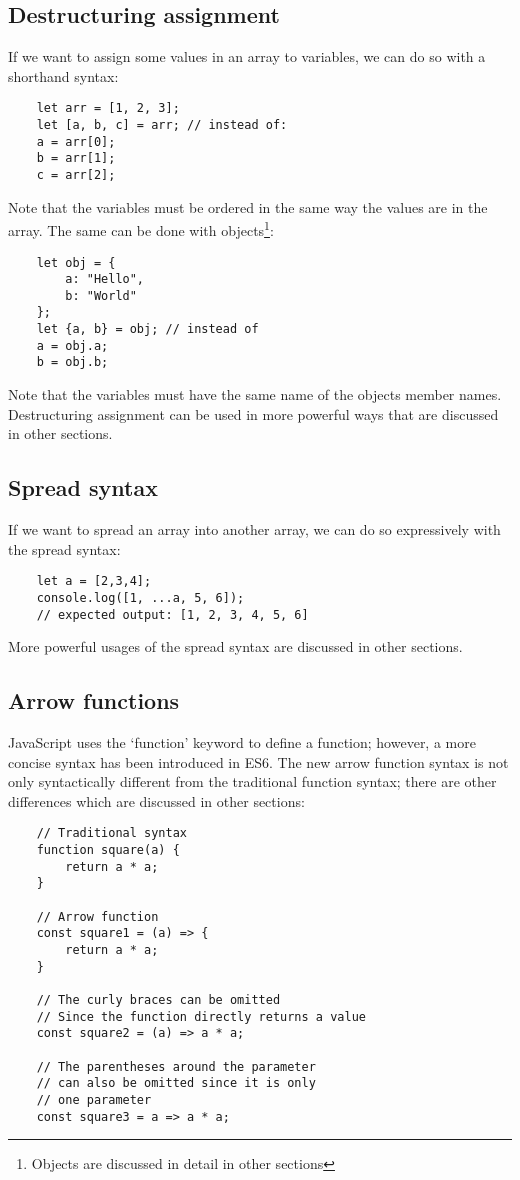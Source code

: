 \documentclass[11pt,a4paper]{article}
\begin{document}
\subsection{Destructuring assignment}
If we want to assign some values in an array to variables, we can do so with a shorthand syntax:
\begin{verbatim}
    let arr = [1, 2, 3];
    let [a, b, c] = arr; // instead of:
    a = arr[0];
    b = arr[1];
    c = arr[2];
\end{verbatim}
Note that the variables must be ordered in the same way the values are in the array.
The same can be done with objects\footnote{Objects are discussed in detail in other sections}:
\begin{verbatim}
    let obj = {
        a: "Hello",
        b: "World"
    };
    let {a, b} = obj; // instead of
    a = obj.a;
    b = obj.b;
\end{verbatim}
Note that the variables must have the same name of the objects member names. Destructuring assignment can be used in more
powerful ways that are discussed in other sections.

\subsection{\label{spread_syntax}Spread syntax}
If we want to spread an array into another array, we can do so expressively with the spread syntax:
\begin{verbatim}
    let a = [2,3,4];
    console.log([1, ...a, 5, 6]);
    // expected output: [1, 2, 3, 4, 5, 6]
\end{verbatim}
More powerful usages of the spread syntax are discussed in other sections.

\subsection{\label{arrow_functions}Arrow functions}
JavaScript uses the `function' keyword to define a function; however, a more concise syntax has been introduced in
ES6. The new arrow function syntax is not only syntactically
different from the traditional function syntax; there are other differences which are discussed in other sections:
\begin{verbatim}
    // Traditional syntax
    function square(a) {
        return a * a;
    }

    // Arrow function
    const square1 = (a) => {
        return a * a;
    }

    // The curly braces can be omitted
    // Since the function directly returns a value
    const square2 = (a) => a * a;

    // The parentheses around the parameter
    // can also be omitted since it is only
    // one parameter
    const square3 = a => a * a;
\end{verbatim}
\end{document}
